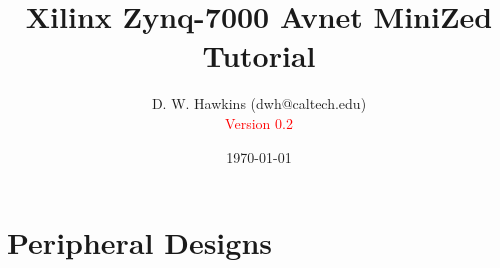 \documentclass[10pt,twoside]{article}
\begin{document}
\title{Xilinx Zynq-7000 Avnet MiniZed Tutorial}
\author{D. W. Hawkins (dwh@caltech.edu)\\\textcolor{red}{Version 0.2}}
\date{\today}

\maketitle

\tableofcontents

\pagestyle{fancy}

\cleardoublepage

%
%

\clearpage

\clearpage
\clearpage

\clearpage





\clearpage

\clearpage
\section{Peripheral Designs}

\clearpage

\clearpage


\appendix
\clearpage

\clearpage

\clearpage

\clearpage

\clearpage

%
%



\end{document}

